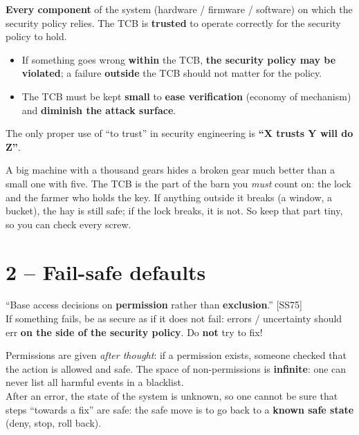\begin{defnbox}[title=Trusted Computing Base (TCB)]
\textbf{Every component} of the system (hardware / firmware / software) on which the
security policy relies. The TCB is \textbf{trusted} to operate correctly for the
security policy to hold.
\end{defnbox}

\begin{propbox}[title=Consequences of the TCB]
\begin{itemize}
  \item If something goes wrong \textbf{within} the TCB, \textbf{the security policy
        may be violated}; a failure \textbf{outside} the TCB should not matter for the
        policy.
  \item The TCB must be kept \textbf{small} to \textbf{ease verification} (economy of
        mechanism) and \textbf{diminish the attack surface}.
\end{itemize}
\end{propbox}

\begin{warnbox}[title=The verb ``to trust'']
The only proper use of ``to trust'' in security engineering is
\textbf{``X trusts Y will do Z''}.
\end{warnbox}

\begin{goatbox}
A big machine with a thousand gears hides a broken gear much better than a small one with five.
The TCB is the part of the barn you \emph{must} count on: the lock and the farmer who holds the
key. If anything outside it breaks (a window, a bucket), the hay is still safe; if the lock
breaks, it is not. So keep that part tiny, so you can check every screw.
\end{goatbox}

\section{2 -- Fail-safe defaults}

\begin{defnbox}[title=Fail-safe defaults]
``Base access decisions on \textbf{permission} rather than \textbf{exclusion}.'' [SS75]
\\
If something fails, be as secure as if it does not fail: errors / uncertainty should
err \textbf{on the side of the security policy}. Do \textbf{not} try to fix!
\end{defnbox}

\begin{rembox}[title={Why permission, and why not fix?}]
Permissions are given \emph{after thought}: if a permission exists, someone checked that the
action is allowed and safe. The space of non-permissions is \textbf{infinite}: one can never list
all harmful events in a blacklist. \\
After an error, the state of the system is unknown, so one cannot be sure that steps ``towards a
fix'' are safe: the safe move is to go back to a \textbf{known safe state} (deny, stop, roll
back).
\end{rembox}

